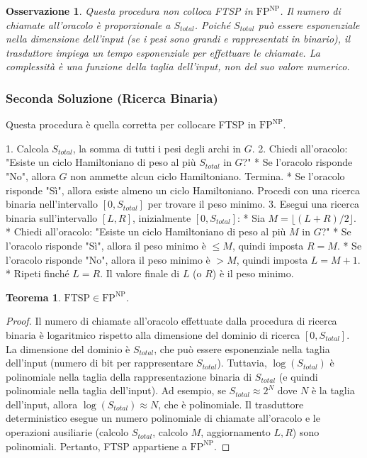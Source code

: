 \documentclass[a4paper]{article}
\newtheorem{theorem}{Teorema}
\newtheorem{remark}{Osservazione}
\begin{document}
\begin{remark}
Questa procedura non colloca FTSP in $\text{FP}^{\text{NP}}$. Il numero di chiamate all'oracolo è proporzionale a $S_{total}$. Poiché $S_{total}$ può essere esponenziale nella dimensione dell'input (se i pesi sono grandi e rappresentati in binario), il trasduttore impiega un tempo esponenziale per effettuare le chiamate. La complessità è una funzione della taglia dell'input, non del suo valore numerico.
\end{remark}

\subsubsection{Seconda Soluzione (Ricerca Binaria)}
Questa procedura è quella corretta per collocare FTSP in $\text{FP}^{\text{NP}}$.

1.  Calcola $S_{total}$, la somma di tutti i pesi degli archi in $G$.
2.  Chiedi all'oracolo: "Esiste un ciclo Hamiltoniano di peso al più $S_{total}$ in $G$?"
    *   Se l'oracolo risponde "No", allora $G$ non ammette alcun ciclo Hamiltoniano. Termina.
    *   Se l'oracolo risponde "Sì", allora esiste almeno un ciclo Hamiltoniano. Procedi con una ricerca binaria nell'intervallo $[0, S_{total}]$ per trovare il peso minimo.
3.  Esegui una ricerca binaria sull'intervallo $[L, R]$, inizialmente $[0, S_{total}]$:
    *   Sia $M = \lfloor (L+R)/2 \rfloor$.
    *   Chiedi all'oracolo: "Esiste un ciclo Hamiltoniano di peso al più $M$ in $G$?"
    *   Se l'oracolo risponde "Sì", allora il peso minimo è $\le M$, quindi imposta $R = M$.
    *   Se l'oracolo risponde "No", allora il peso minimo è $> M$, quindi imposta $L = M+1$.
    *   Ripeti finché $L=R$. Il valore finale di $L$ (o $R$) è il peso minimo.

\begin{theorem}
$\text{FTSP} \in \text{FP}^{\text{NP}}$.
\end{theorem}
\begin{proof}
Il numero di chiamate all'oracolo effettuate dalla procedura di ricerca binaria è logaritmico rispetto alla dimensione del dominio di ricerca $[0, S_{total}]$.
La dimensione del dominio è $S_{total}$, che può essere esponenziale nella taglia dell'input (numero di bit per rappresentare $S_{total}$).
Tuttavia, $\log(S_{total})$ è polinomiale nella taglia della rappresentazione binaria di $S_{total}$ (e quindi polinomiale nella taglia dell'input).
Ad esempio, se $S_{total} \approx 2^N$ dove $N$ è la taglia dell'input, allora $\log(S_{total}) \approx N$, che è polinomiale.
Il trasduttore deterministico esegue un numero polinomiale di chiamate all'oracolo e le operazioni ausiliarie (calcolo $S_{total}$, calcolo $M$, aggiornamento $L, R$) sono polinomiali. Pertanto, FTSP appartiene a $\text{FP}^{\text{NP}}$.
\end{proof}
\end{document}
